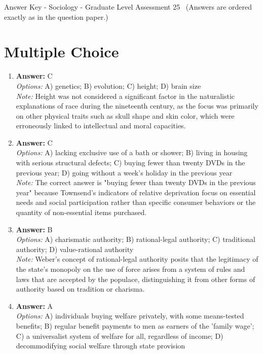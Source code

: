 \documentclass[12pt]{article}
\begin{document}
\begin{center}
Answer Key - Sociology - Graduate Level Assessment 25 \
\small (Answers are ordered exactly as in the question paper.)
\end{center}

\section*{Multiple Choice}
\begin{enumerate}[label=\arabic*.]
\item \textbf{Answer:} C
\\ \textit{Options:} A) genetics; B) evolution; C) height; D) brain size
\\ \textit{Note:} Height was not considered a significant factor in the naturalistic explanations of race during the nineteenth century, as the focus was primarily on other physical traits such as skull shape and skin color, which were erroneously linked to intellectual and moral capacities.
\item \textbf{Answer:} C
\\ \textit{Options:} A) lacking exclusive use of a bath or shower; B) living in housing with serious structural defects; C) buying fewer than twenty DVDs in the previous year; D) going without a week's holiday in the previous year
\\ \textit{Note:} The correct answer is "buying fewer than twenty DVDs in the previous year" because Townsend's indicators of relative deprivation focus on essential needs and social participation rather than specific consumer behaviors or the quantity of non-essential items purchased.
\item \textbf{Answer:} B
\\ \textit{Options:} A) charismatic authority; B) rational-legal authority; C) traditional authority; D) value-rational authority
\\ \textit{Note:} Weber's concept of rational-legal authority posits that the legitimacy of the state's monopoly on the use of force arises from a system of rules and laws that are accepted by the populace, distinguishing it from other forms of authority based on tradition or charisma.
\item \textbf{Answer:} A
\\ \textit{Options:} A) individuals buying welfare privately, with some means-tested benefits; B) regular benefit payments to men as earners of the 'family wage'; C) a universalist system of welfare for all, regardless of income; D) decommodifying social welfare through state provision

\end{enumerate}
\end{document}
